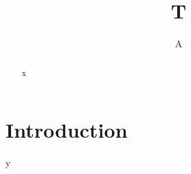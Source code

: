 \documentclass{article}
\title{T}
\author{A}
\begin{document}
\maketitle
\begin{abstract}
x
\end{abstract}
\section{Introduction}
y
\end{document}
